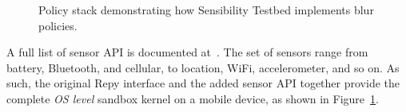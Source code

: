 \begin{figure}
\caption{\small Policy stack demonstrating how Sensibility Testbed implements blur policies.
\label{fig-blur}}
\end{figure}


A full list of sensor API is documented at~\cite{sensor-api}. The set
of sensors range from battery, Bluetooth, and cellular, to location, WiFi, 
accelerometer, and so on. 
As such, the original Repy interface and the added sensor API together 
provide the complete \textit{OS level} sandbox kernel on a mobile 
device, as shown in Figure~\ref{fig-blur}.
